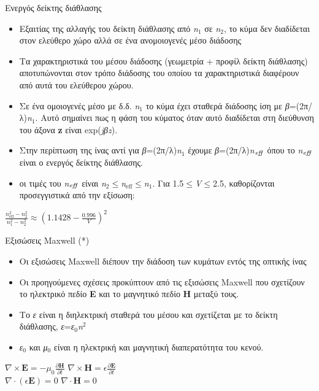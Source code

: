 \documentclass[11pt,aspectratio=169]{beamer}
\begin{document}
\begin{frame}[shrink=20,t]{Ενεργός δείκτης διάθλασης}
\begin{itemize}
\item Εξαιτίας της αλλαγής του δείκτη διάθλασης από \textit{n}$_{\text{1}}$ σε \textit{n}$_{\text{2}}$, το κύμα δεν διαδίδεται στον ελεύθερο χώρο αλλά σε ένα ανομοιογενές μέσο διάδοσης
\item Τα χαρακτηριστικά του μέσου διάδοσης (γεωμετρία + προφίλ δείκτη διάθλασης) αποτυπώνονται στον τρόπο διάδοσης του οποίου τα χαρακτηριστικά διαφέρουν από αυτά του ελεύθερου χώρου.
\item Σε ένα ομοιογενές μέσο με δ.δ. \textit{n}$_{\text{1}}$ το κύμα έχει σταθερά διάδοσης ίση με \textit{β}=(2π/λ)\textit{n}$_{\text{1}}$. Αυτό σημαίνει πως η φάση του κύματος όταν αυτό διαδίδεται στη διεύθυνση του άξονα \textbf{z} είναι exp(\textit{j}\textit{β}\textit{z}).
\item Στην περίπτωση της ίνας αντί για \textit{β}=(2π/λ)\textit{n}$_{\text{1}}$ έχουμε \textit{ β}=(2π/λ)\textit{n}$_{\text{\textit{eff}}}$\textit{ }όπου το \textit{n}$_{\text{\textit{eff}}}$ είναι ο ενεργός δείκτης διάθλασης.
\item οι τιμές του \textit{n}$_{\text{\textit{eff}}}$ είναι \textit{n}$_{\text{2}}$\ensuremath{\le}\textit{n}$_{\text{eff}}$\ensuremath{\le}\textit{n}$_{\text{1}}$. Για 1.5\ensuremath{\le}\textit{V}\ensuremath{\le}2.5, καθορίζονται προσεγγιστικά από την εξίσωση:
\end{itemize}
\begin{center}
$\displaystyle \frac{n_{\mathrm{eff}}^{2}-n_{2}^{2}}{n_{1}^{2}-n_{2}^{2}}\approx\left(1.1428-\frac{0.996}{V}\right)^{2}$\\[0.6ex]
\end{center}
\end{frame}

\begin{frame}[shrink=20,t]{Εξισώσεις Maxwell (*)}
\begin{itemize}
\item Οι εξισώσεις Maxwell διέπουν την διάδοση των κυμάτων εντός της οπτικής ίνας
\item Οι προηγούμενες σχέσεις προκύπτουν από τις εξισώσεις Maxwell που σχετίζουν το ηλεκτρικό πεδίο \textbf{E }και το μαγνητικό πεδίο \textbf{H} μεταξύ τους.
\item Το \textit{ε} είναι η διηλεκτρική σταθερά του μέσου και σχετίζεται με το δείκτη διάθλασης, \textit{ε}=\textit{ε}$_{\text{0}}$\textit{n}$^{\text{2}}$
\item \textit{ε}$_{\text{0}}$ και \textit{μ}$_{\text{0}}$ είναι η ηλεκτρική και μαγνητική διαπερατότητα του κενού.
\end{itemize}
\begin{center}
$\displaystyle \nabla\times\mathbf{E}=-\mu_{0}\frac{\partial\mathbf{H}}{\partial t}$ $\displaystyle \nabla\times\mathbf{H}=\epsilon\frac{\partial\mathbf{E}}{\partial t}$\\[0.6ex]
$\displaystyle \nabla\cdot(\epsilon\mathbf{E})=0$ $\displaystyle \nabla\cdot\mathbf{H}=0$\\[0.6ex]
\end{center}
\end{frame}
\end{document}
